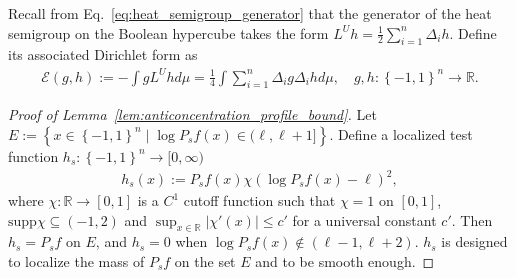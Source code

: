 \documentclass[11pt]{article}
\newcommand{\supp}{\text{supp}}
\newcommand{\fA}{\mathfrak{A}}
\newcommand{\fL}{L^U}
\newcommand{\dirichlet}{\mathcal{E}}
\theoremstyle{named}
\theoremstyle{plain}
\newcommand{\defn}{:=}
\newcommand{\real}{\ensuremath{\mathbb{R}}}
\newcommand{\Ent}{\text{Ent}}
\newcommand{\braces}[1]{\left\{ #1 \right \}}
\newcommand{\abss}[1]{\left| #1 \right |}
\begin{document}
Recall from Eq.~\eqref{eq:heat_semigroup_generator} that the generator of the heat semigroup on the Boolean hypercube takes the form 
  $\fL h = \frac{1}{2} \sum_{i=1}^n \Delta_i h$. Define its associated Dirichlet form as 
  \begin{align}
    \label{eq:def_Dirichlet_form}
    \dirichlet(g, h) \defn - \int g \fL h d\mu = \frac14 \int \sum_{i=1}^n \Delta_i g \Delta_i h d\mu, \quad g, h: \braces{-1, 1}^n \to \real.
  \end{align}

\begin{proof}[Proof of Lemma~\ref{lem:anticoncentration_profile_bound}]
  Let $E \defn \braces{x \in \braces{-1,1}^n \mid \log P_s f(x) \in (\ell, \ell + 1]}$. Define a localized test function $h_s: \braces{-1, 1}^n \to [0, \infty)$
  \begin{align*}
    h_s(x) \defn P_s f(x) \chi(\log P_s f(x) - \ell)^2,
  \end{align*}
  where $\chi: \real \to [0,1]$ is a $C^1$ cutoff function such that $\chi = 1$ on $[0, 1]$, $\supp \chi \subseteq (-1, 2)$ and $\sup_{x \in \real} \abss{\chi'(x)} \leq c'$ for a universal constant $c'$. Then $h_s = P_s f$ on $E$, and $h_s = 0$ when $\log P_s f(x) \notin (\ell - 1, \ell + 2)$. $h_s$ is designed to localize the mass of $P_s f$ on the set $E$ and to be smooth enough.

  

\end{proof}
\end{document}
